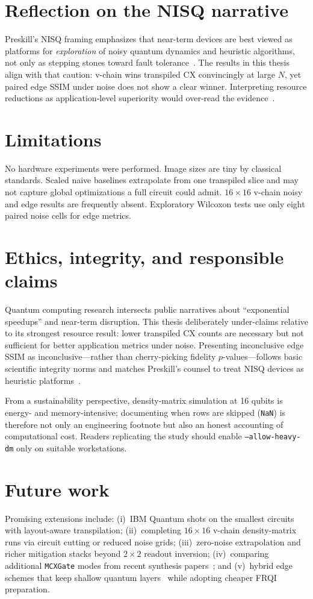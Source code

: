 \section{Reflection on the NISQ narrative}
Preskill's NISQ framing emphasizes that near-term devices are best viewed as platforms for \emph{exploration} of noisy quantum dynamics and heuristic algorithms, not only as stepping stones toward fault tolerance~\cite{Preskill2018NISQ}. The results in this thesis align with that caution: v-chain wins transpiled CX convincingly at large $N$, yet paired edge SSIM under noise does not show a clear winner. Interpreting resource reductions as application-level superiority would over-read the evidence~\cite{NielsenChuang2010}.

\section{Limitations}
No hardware experiments were performed. Image sizes are tiny by classical standards. Scaled naive baselines extrapolate from one transpiled slice and may not capture global optimizations a full circuit could admit. $16\times 16$ v-chain noisy and edge results are frequently absent. Exploratory Wilcoxon tests use only eight paired noise cells for edge metrics.

\section{Ethics, integrity, and responsible claims}
Quantum computing research intersects public narratives about ``exponential speedups'' and near-term disruption. This thesis deliberately under-claims relative to its strongest resource result: lower transpiled CX counts are necessary but not sufficient for better application metrics under noise. Presenting inconclusive edge SSIM as inconclusive---rather than cherry-picking fidelity $p$-values---follows basic scientific integrity norms and matches Preskill's counsel to treat NISQ devices as heuristic platforms~\cite{Preskill2018NISQ}.

From a sustainability perspective, density-matrix simulation at 16 qubits is energy- and memory-intensive; documenting when rows are skipped (\texttt{NaN}) is therefore not only an engineering footnote but also an honest accounting of computational cost. Readers replicating the study should enable \texttt{--allow-heavy-dm} only on suitable workstations.

\section{Future work}
Promising extensions include: (i)~IBM Quantum shots on the smallest circuits with layout-aware transpilation; (ii)~completing $16\times 16$ v-chain density-matrix runs via circuit cutting or reduced noise grids; (iii)~zero-noise extrapolation and richer mitigation stacks beyond $2\times 2$ readout inversion; (iv)~comparing additional \texttt{MCXGate} modes from recent synthesis papers~\cite{Arsoski2024MCXQFT,Zindorf2024EfficientMCG}; and (v)~hybrid edge schemes that keep shallow quantum layers~\cite{Geng2022HybridNISQEdge,Shubha2024EdgeDetectionQuantumized} while adopting cheaper FRQI preparation.
